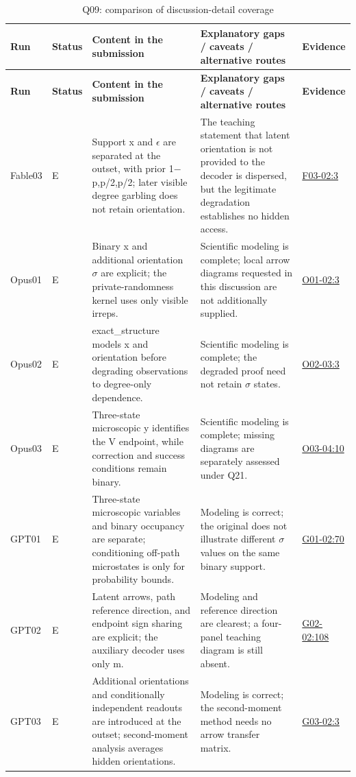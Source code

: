 \documentclass[11pt,a4paper]{article}
\begin{document}
{\fontsize{9.0}{12.6}\selectfont
\setlength{\tabcolsep}{2.5pt}
\begin{longtable}{>{\raggedright\arraybackslash}p{}>{\raggedright\arraybackslash}p{}>{\raggedright\arraybackslash}p{}>{\raggedright\arraybackslash}p{}>{\raggedright\arraybackslash}p{}}
\caption{Q09: comparison of discussion-detail coverage}\\
\toprule
\textbf{Run} & \textbf{Status} & \textbf{Content in the submission} & \textbf{Explanatory gaps /\allowbreak{} caveats /\allowbreak{} alternative routes} & \textbf{Evidence}\tabularnewline
\midrule
\endfirsthead
\toprule
\textbf{Run} & \textbf{Status} & \textbf{Content in the submission} & \textbf{Explanatory gaps /\allowbreak{} caveats /\allowbreak{} alternative routes} & \textbf{Evidence}\tabularnewline
\midrule
\endhead
{}Fable03 & E & Support x and \ensuremath{\epsilon} are separated at the outset,\allowbreak{} with prior 1\ensuremath{-}p,\allowbreak{}p/\allowbreak{}2,\allowbreak{}p/\allowbreak{}2; later visible degree garbling does not retain orientation. & The teaching statement that latent orientation is not provided to the decoder is dispersed,\allowbreak{} but the legitimate degradation establishes no hidden access. & \hyperref[src:F03-02]{F03-02:3}\tabularnewline
{}Opus01 & E & Binary x and additional orientation \ensuremath{\sigma} are explicit; the private-randomness kernel uses only visible irreps. & Scientific modeling is complete; local arrow diagrams requested in this discussion are not additionally supplied. & \hyperref[src:O01-02]{O01-02:3}\tabularnewline
{}Opus02 & E & exact\_structure models x and orientation before degrading observations to degree-only dependence. & Scientific modeling is complete; the degraded proof need not retain \ensuremath{\sigma} states. & \hyperref[src:O02-03]{O02-03:3}\tabularnewline
{}Opus03 & E & Three-state microscopic y identifies the V endpoint,\allowbreak{} while correction and success conditions remain binary. & Scientific modeling is complete; missing diagrams are separately assessed under Q21. & \hyperref[src:O03-04]{O03-04:10}\tabularnewline
{}GPT01 & E & Three-state microscopic variables and binary occupancy are separate; conditioning off-path microstates is only for probability bounds. & Modeling is correct; the original does not illustrate different \ensuremath{\sigma} values on the same binary support. & \hyperref[src:G01-02]{G01-02:70}\tabularnewline
{}GPT02 & E & Latent arrows,\allowbreak{} path reference direction,\allowbreak{} and endpoint sign sharing are explicit; the auxiliary decoder uses only m. & Modeling and reference direction are clearest; a four-panel teaching diagram is still absent. & \hyperref[src:G02-02]{G02-02:108}\tabularnewline
{}GPT03 & E & Additional orientations and conditionally independent readouts are introduced at the outset; second-moment analysis averages hidden orientations. & Modeling is correct; the second-moment method needs no arrow transfer matrix. & \hyperref[src:G03-02]{G03-02:3}\tabularnewline
\bottomrule
\end{longtable}
}
\end{document}
